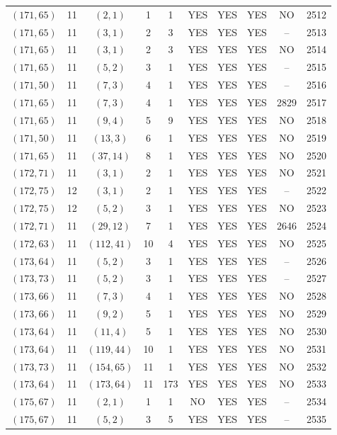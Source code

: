 \begin{longtable}{|c|c|c|c|c|c|c|c|c|c|}
$(171, 65)$ & 11 & $(2, 1)$ & 1 & 1 & YES & YES & YES & NO & 2512\\
$(171, 65)$ & 11 & $(3, 1)$ & 2 & 3 & YES & YES & YES & -- & 2513\\
$(171, 65)$ & 11 & $(3, 1)$ & 2 & 3 & YES & YES & YES & NO & 2514\\
$(171, 65)$ & 11 & $(5, 2)$ & 3 & 1 & YES & YES & YES & -- & 2515\\
$(171, 50)$ & 11 & $(7, 3)$ & 4 & 1 & YES & YES & YES & -- & 2516\\
$(171, 65)$ & 11 & $(7, 3)$ & 4 & 1 & YES & YES & YES & 2829 & 2517\\
$(171, 65)$ & 11 & $(9, 4)$ & 5 & 9 & YES & YES & YES & NO & 2518\\
$(171, 50)$ & 11 & $(13, 3)$ & 6 & 1 & YES & YES & YES & NO & 2519\\
$(171, 65)$ & 11 & $(37, 14)$ & 8 & 1 & YES & YES & YES & NO & 2520\\
$(172, 71)$ & 11 & $(3, 1)$ & 2 & 1 & YES & YES & YES & NO & 2521\\
$(172, 75)$ & 12 & $(3, 1)$ & 2 & 1 & YES & YES & YES & -- & 2522\\
$(172, 75)$ & 12 & $(5, 2)$ & 3 & 1 & YES & YES & YES & NO & 2523\\
$(172, 71)$ & 11 & $(29, 12)$ & 7 & 1 & YES & YES & YES & 2646 & 2524\\
$(172, 63)$ & 11 & $(112, 41)$ & 10 & 4 & YES & YES & YES & NO & 2525\\
$(173, 64)$ & 11 & $(5, 2)$ & 3 & 1 & YES & YES & YES & -- & 2526\\
$(173, 73)$ & 11 & $(5, 2)$ & 3 & 1 & YES & YES & YES & -- & 2527\\
$(173, 66)$ & 11 & $(7, 3)$ & 4 & 1 & YES & YES & YES & NO & 2528\\
$(173, 66)$ & 11 & $(9, 2)$ & 5 & 1 & YES & YES & YES & NO & 2529\\
$(173, 64)$ & 11 & $(11, 4)$ & 5 & 1 & YES & YES & YES & NO & 2530\\
$(173, 64)$ & 11 & $(119, 44)$ & 10 & 1 & YES & YES & YES & NO & 2531\\
$(173, 73)$ & 11 & $(154, 65)$ & 11 & 1 & YES & YES & YES & NO & 2532\\
$(173, 64)$ & 11 & $(173, 64)$ & 11 & 173 & YES & YES & YES & NO & 2533\\
$(175, 67)$ & 11 & $(2, 1)$ & 1 & 1 & NO & YES & YES & -- & 2534\\
$(175, 67)$ & 11 & $(5, 2)$ & 3 & 5 & YES & YES & YES & -- & 2535\\

\end{longtable}
